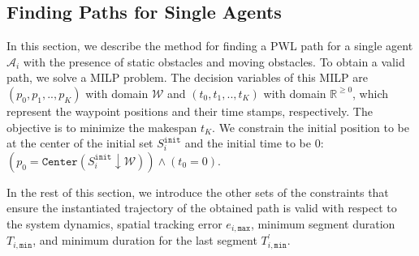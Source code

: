 \documentclass[letterpaper]{article} %
\theoremstyle{definition}
\newcommand{\reals}{\mathbb{R}}
\newcommand{\nnreals}{\reals^{\ge 0}}
\begin{document}



\subsection{Finding Paths for Single Agents}\label{section:approach:milp}


In this section, we describe the method for finding a PWL path for a single agent $\mathcal{A}_i$ with the presence of static obstacles and moving obstacles. To obtain a valid path, we solve a MILP problem. The decision variables of this MILP are $(p_{0}, p_{1}, ..,p_{K})$ with domain $\mathcal{W}$ and $(t_{0}, t_{1}, .., t_{K})$ with domain $\nnreals$, which represent the waypoint positions and their time stamps, respectively. The objective is to minimize the makespan $t_{K}$. We constrain the initial position to be at the center of the initial set $S^\texttt{init}_i$ and the initial time to be $0$: %
    $(p_0 = \texttt{Center}(S^\texttt{init}_i \downarrow \mathcal{W})) \land ( t_0 = 0 )$.

In the rest of this section, we introduce the other sets of the constraints that ensure the instantiated trajectory of the obtained path is valid with respect to the system dynamics, spatial tracking error $e_{i,\texttt{max}}$, minimum segment duration $T_{i,\texttt{min}}$, and minimum duration for the last segment $T_{i,\texttt{min}}^\prime$.
\end{document}
